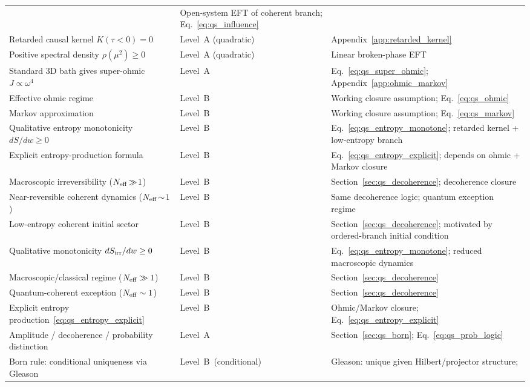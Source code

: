 \begin{table}[h]
\begin{tabular}{p{6.0cm}p{2.4cm}p{4.5cm}}
  & Open-system EFT of coherent branch;
    Eq.~\eqref{eq:qs_influence} \\
Retarded causal kernel $K(\tau<0)=0$
  & Level~A (quadratic)
  & Appendix~\ref{app:retarded_kernel} \\
Positive spectral density $\rho(\mu^2)\ge 0$
  & Level~A (quadratic)
  & Linear broken-phase EFT \\
Standard 3D bath gives super-ohmic $J\!\propto\!\omega^4$
  & Level~A
  & Eq.~\eqref{eq:qs_super_ohmic};
    Appendix~\ref{app:ohmic_markov} \\
Effective ohmic regime
  & Level~B
  & Working closure assumption; Eq.~\eqref{eq:qs_ohmic} \\
Markov approximation
  & Level~B
  & Working closure assumption; Eq.~\eqref{eq:qs_markov} \\
Qualitative entropy monotonicity $dS/dw\ge 0$
  & Level~B
  & Eq.~\eqref{eq:qs_entropy_monotone};
    retarded kernel + low-entropy branch \\
Explicit entropy-production formula
  & Level~B
  & Eq.~\eqref{eq:qs_entropy_explicit};
    depends on ohmic + Markov closure \\
Macroscopic irreversibility ($N_{\rm eff}\!\gg\!1$)
  & Level~B
  & Section~\ref{sec:qs_decoherence};
    decoherence closure \\
Near-reversible coherent dynamics ($N_{\rm eff}\!\sim\!1$)
  & Level~B
  & Same decoherence logic; quantum exception regime \\
Low-entropy coherent initial sector
  & Level~B
  & Section~\ref{sec:qs_decoherence};
    motivated by ordered-branch initial condition \\
Qualitative monotonicity $dS_{\rm irr}/dw\ge0$
  & Level~B
  & Eq.~\eqref{eq:qs_entropy_monotone};
    reduced macroscopic dynamics \\
Macroscopic/classical regime ($N_{\rm eff}\gg1$)
  & Level~B
  & Section~\ref{sec:qs_decoherence} \\
Quantum-coherent exception ($N_{\rm eff}\sim1$)
  & Level~B
  & Section~\ref{sec:qs_decoherence} \\
Explicit entropy production~\eqref{eq:qs_entropy_explicit}
  & Level~B
  & Ohmic/Markov closure;
    Eq.~\eqref{eq:qs_entropy_explicit} \\
Amplitude / decoherence / probability distinction
  & Level~A
  & Section~\ref{sec:qs_born};
    Eq.~\eqref{eq:qs_prob_logic} \\
Born rule: conditional uniqueness via Gleason
  & Level~B~(conditional)
  & Gleason: unique given Hilbert/projector structure;

\end{tabular}
\end{table}
